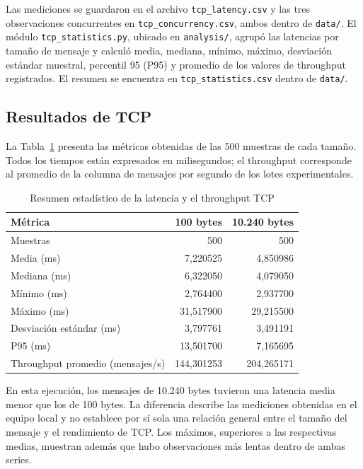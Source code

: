 Las mediciones se guardaron en el archivo \texttt{tcp\_latency.csv} y las tres
observaciones concurrentes en \texttt{tcp\_concurrency.csv}, ambos dentro de
\texttt{data/}. El módulo \texttt{tcp\_statistics.py}, ubicado en
\texttt{analysis/}, agrupó las latencias por tamaño de
mensaje y calculó media, mediana, mínimo, máximo, desviación estándar
muestral, percentil 95 (P95) y promedio de los valores de throughput
registrados. El resumen se encuentra en \texttt{tcp\_statistics.csv} dentro
de \texttt{data/}.

\subsection{Resultados de TCP}

La Tabla~\ref{tab:tcp-jordan-estadisticas} presenta las métricas obtenidas
de las 500 muestras de cada tamaño. Todos los tiempos están expresados en
milisegundos; el throughput corresponde al promedio de la columna de
mensajes por segundo de los lotes experimentales.

\begin{table}[htbp]
\centering
\caption{Resumen estadístico de la latencia y el throughput TCP}
\label{tab:tcp-jordan-estadisticas}
\begin{tabular}{lrr}
\hline
\textbf{Métrica} & \textbf{100 bytes} & \textbf{10.240 bytes} \\
\hline
Muestras & 500 & 500 \\
Media (ms) & 7,220525 & 4,850986 \\
Mediana (ms) & 6,322050 & 4,079050 \\
Mínimo (ms) & 2,764400 & 2,937700 \\
Máximo (ms) & 31,517900 & 29,215500 \\
Desviación estándar (ms) & 3,797761 & 3,491191 \\
P95 (ms) & 13,501700 & 7,165695 \\
Throughput promedio (mensajes/s) & 144,301253 & 204,265171 \\
\hline
\end{tabular}
\end{table}

En esta ejecución, los mensajes de 10.240 bytes tuvieron una latencia media
menor que los de 100 bytes. La diferencia describe las mediciones obtenidas
en el equipo local y no establece por sí sola una relación general entre el
tamaño del mensaje y el rendimiento de TCP. Los máximos, superiores a las
respectivas medias, muestran además que hubo observaciones más lentas dentro
de ambas series.

